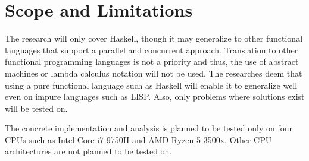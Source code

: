 \section{Scope and Limitations}

The research will only cover Haskell, though it may generalize to other functional languages that support a parallel 
and concurrent approach. Translation to other functional programming languages is not a priority and thus, the use 
of abstract machines or lambda calculus notation will not be used. The researches deem that using a pure functional language 
such as Haskell will enable it to generalize well even on impure languages such as LISP.
Also, only problems where solutions exist will be tested on. 

The concrete implementation and analysis is planned to be tested only on four CPUs such as Intel Core i7-9750H and AMD Ryzen 5 3500x.
Other CPU architectures are not planned to be tested on.